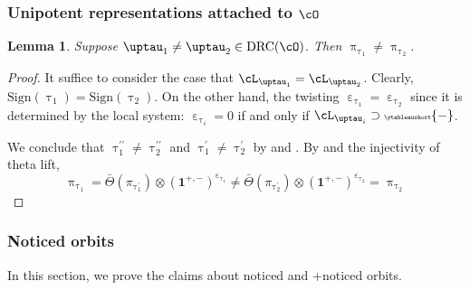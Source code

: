 \documentclass[12pt,a4paper]{amsart}
\newcommand{\bfone}{\mathbf{1}}
\numberwithin{equation}{section}
\newtheorem{lem}[thm]{Lemma}
\theoremstyle{remark}
\def\ssign{\mathrm{Sign}}
\def\Thetab{\bar{\Theta}}
\def\drc{\mathrm{DRC}}
\let\ytb=\ytableaushort
\newcommand{\tytb}[1]{{\tiny\ytb{#1}}}
\def\cOpp{\cO^{\prime\prime}}
\def\pcL{\cL^+}
\def\uptaup{\uptau^{\prime}}
\def\uptaupp{\uptau^{\prime\prime}}
\begin{document}




\subsubsection{Unipotent representations attached to $\cO$}

\begin{lem}\label{c:gd.D1}
  Suppose $\uptau_{1}\neq \uptau_{2}\in \drc(\cO)$. Then $\uppi_{\uptau_{1}}\neq \uppi_{\uptau_{2}}$.
\end{lem}
\begin{proof}
 It suffice to consider the case that $\cL_{\uptau_{1}}=\cL_{\uptau_{2}}$.
 Clearly, $\ssign(\uptau_{1})=\ssign(\uptau_{2})$. On the other hand,
 the twisting $\upepsilon_{\uptau_{1}}=\upepsilon_{\uptau_{2}}$ since it is
 determined by the  local system:
 $\upepsilon_{\uptau_{i}}=0$ if and only if $\cL_{\uptau_{i}}\supset \tytb{-}$.

 We conclude that $\uptaupp_{1}\neq \uptaupp_{2}$ and $\uptaup_{1}\neq \uptaup_{2}$
 by  and .
 By  and the injectivity of theta lift,
 \[
   \uppi_{\uptau_{1}} = \Thetab(\pi_{\uptaup_{1}})\otimes (\bfone^{+,-})^{\upepsilon_{\uptau_{1}}}
  \neq \Thetab(\pi_{\uptaup_{2}})\otimes (\bfone^{+,-})^{\upepsilon_{\uptau_{2}}} = \uppi_{\uptau_{2}}
 \]
\end{proof}


\subsubsection{Noticed orbits}



In this section, we prove the claims about noticed and +noticed orbits.
\end{document}
